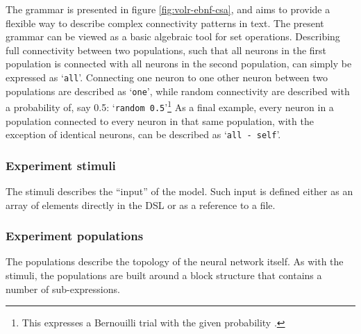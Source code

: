 The grammar is presented in figure \ref{fig:volr-ebnf-csa}, and aims to provide
a flexible way to describe complex connectivity patterns in text.
The present grammar can be viewed as a basic algebraic tool for set operations.
Describing full connectivity between two populations, such that all neurons
in the first population is connected with all neurons in the second population,
can simply be expressed as `\texttt{all}'.
Connecting one neuron to one other neuron between two populations are described
as `\texttt{one}', while random connectivity are described with a probability
of, say 0.5: `\texttt{random 0.5}'\footnote{
  This expresses a Bernouilli trial with the given probability
  \autocite{Djurfeldt2012}.
}
As a final example, every neuron in a population connected to every neuron in
that same population, with the exception of identical neurons, can be described
as `\texttt{all - self}'.
%
%
%
%

\subsubsection{Experiment stimuli}
The stimuli describes the ``input'' of the model.
Such input is defined either as an array of elements directly in the DSL
or as a reference to a file.

\subsubsection{Experiment populations}
The populations describe the topology of the neural network itself.
As with the stimuli, the populations are built around a block structure that
contains a number of sub-expressions.

